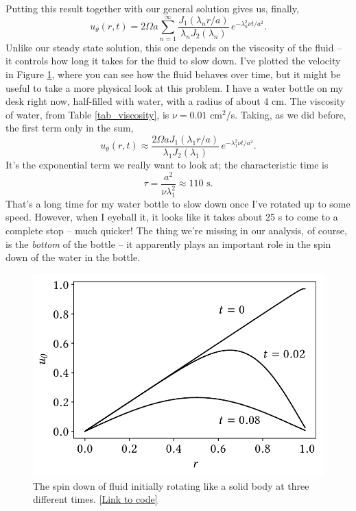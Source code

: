 Putting this result together with our general solution gives us, finally,
\begin{equation}
u_\theta(r, t) = 2\Omega a \sum_{n=1}^\infty \frac{J_1(\lambda_n r/a)}{\lambda_n J_2(\lambda_n)} \, e^{-\lambda_n^2 \nu t / a^2}.
\end{equation}
Unlike our steady state solution, this one depends on the viscosity of the fluid -- it controls how long it takes for the fluid to slow down.  I've plotted the velocity in Figure \ref{fig_spin_vel}, where you can see how the fluid behaves over time, but it might be useful to take a more physical look at this problem.  I have a water bottle on my desk right now, half-filled with water, with a radius of about $4$ cm.  The viscosity of water, from Table \ref{tab_viscosity}, is $\nu = 0.01$ cm$^2$/s.  Taking, as we did before, the first term only in the sum, 
\[
u_\theta(r, t) \approx \frac{2\Omega a J_1(\lambda_1 r/a)}{\lambda_1 J_2(\lambda_1)} \, e^{-\lambda_1^2 \nu t / a^2}.
\]
It's the exponential term we really want to look at; the characteristic time is
\[
\tau = \frac{a^2}{\nu \lambda_1^2} \approx 110 \text{ s}.
\]
That's a long time for my water bottle to slow down once I've rotated up to some speed.  However, when I eyeball it, it looks like it takes about 25 s to come to a complete stop -- much quicker!  The thing we're missing in our analysis, of course, is the \emph{bottom} of the bottle -- it apparently plays an important role in the spin down of the water in the bottle.

\begin{figure}
\centering
\includegraphics[width=0.7\linewidth]{Figures/Chapter2/fig_spin_vel}
\caption{The spin down of fluid initially rotating like a solid body at three different times. \href{https://nbviewer.jupyter.org/github/josephmacmillan/IntroFluidDynamics/blob/master/Jupyter/2-ViscousFluids.ipynb\#Figure-2.11:-Spin-down}{[Link to code]}}
\label{fig_spin_vel}
\end{figure}


